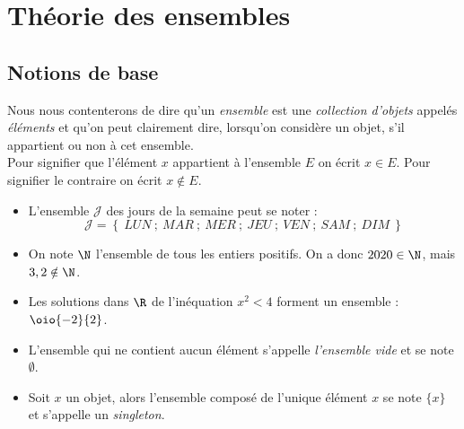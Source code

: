 \chapter{Théorie des ensembles}

\section{Notions de base}

\begin{definition}
    Nous nous contenterons de dire qu'un \textit{ensemble} est une \textit{collection d'objets}  appelés \textit{éléments} et qu'on peut clairement dire, lorsqu'on considère un objet, s'il appartient ou non à cet ensemble.\\
    Pour signifier que l'élément $x$ appartient à l'ensemble $E$ on écrit $x\in E$. Pour signifier le contraire on écrit $x\notin E$.
\end{definition}

\begin{exemple}[s]
    \begin{itemize}
        \item
              L'ensemble $\mathcal{J}$ des jours de la semaine peut se noter :
              $$\mathcal{J}=\left\lbrace\ LUN\ ;\ MAR\ ;\ MER\ ;\ JEU\ ;\ VEN\ ;\ SAM\ ;\ DIM\ \right\rbrace$$


        \item 	On note $\N$ l'ensemble de tous les entiers positifs. On a donc $2020\in\N$, mais $3,2\notin\N$.
        \item 	Les solutions dans $\R$ de l'inéquation $x^2<4$ forment un ensemble : $\oio{-2}{2}$.
    \end{itemize}

\end{exemple}
\begin{definition}
    \begin{itemize}
        \item 	L'ensemble qui ne contient aucun élément s'appelle \textit{l'ensemble vide} et se note $\emptyset$.
        \item 	Soit $x$ un objet, alors l'ensemble composé de l'unique élément $x$ se note $\lbrace x\rbrace$ et s'appelle un \textit{singleton}.
    \end{itemize}
\end{definition}

